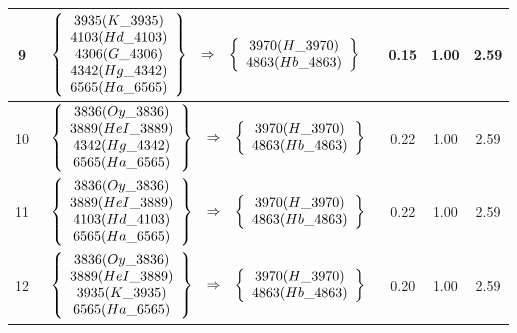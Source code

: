 \begin{longtable}{| c | l | c | c | c |}
9 & $\begin{array}{c c c}\left\{\begin{array}{c}3935 (K\_3935) \\ 4103 (Hd\_4103) \\ 4306 (G\_4306) \\ 4342 (Hg\_4342) \\ 6565 (Ha\_6565)\end{array}\right\} & \Rightarrow & \left\{\begin{array}{c}3970 (H\_3970) \\ 4863 (Hb\_4863)\end{array}\right\}\end{array}$ & 0.15 & 1.00 & 2.59 \\ \hline
10 & $\begin{array}{c c c}\left\{\begin{array}{c}3836 (Oy\_3836) \\ 3889 (HeI\_3889) \\ 4342 (Hg\_4342) \\ 6565 (Ha\_6565)\end{array}\right\} & \Rightarrow & \left\{\begin{array}{c}3970 (H\_3970) \\ 4863 (Hb\_4863)\end{array}\right\}\end{array}$ & 0.22 & 1.00 & 2.59 \\ \hline
11 & $\begin{array}{c c c}\left\{\begin{array}{c}3836 (Oy\_3836) \\ 3889 (HeI\_3889) \\ 4103 (Hd\_4103) \\ 6565 (Ha\_6565)\end{array}\right\} & \Rightarrow & \left\{\begin{array}{c}3970 (H\_3970) \\ 4863 (Hb\_4863)\end{array}\right\}\end{array}$ & 0.22 & 1.00 & 2.59 \\ \hline
12 & $\begin{array}{c c c}\left\{\begin{array}{c}3836 (Oy\_3836) \\ 3889 (HeI\_3889) \\ 3935 (K\_3935) \\ 6565 (Ha\_6565)\end{array}\right\} & \Rightarrow & \left\{\begin{array}{c}3970 (H\_3970) \\ 4863 (Hb\_4863)\end{array}\right\}\end{array}$ & 0.20 & 1.00 & 2.59 \\ \hline

\end{longtable}

